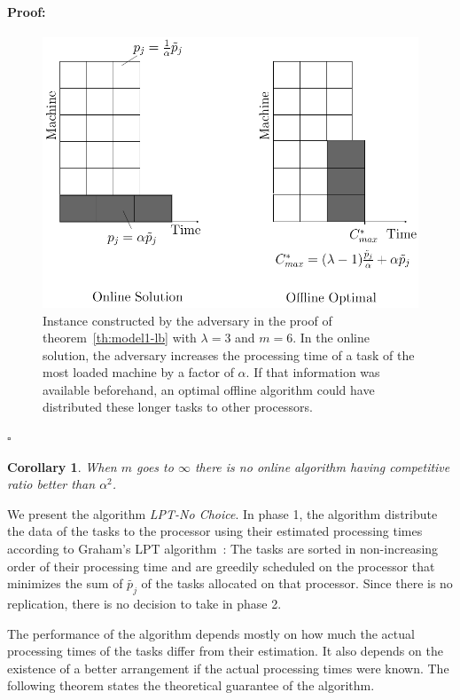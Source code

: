 \documentclass[12pt]{article}
\theoremstyle{mystyle}
\newtheorem{corollary}{Corollary}[theorem]
\newenvironment{myproof}{\paragraph{Proof:}}{\hfill$\square$}
\begin{document}
\begin{myproof}
   
     \begin{figure}[htp]
     \centering
     \includegraphics[width= 12 cm]{model1.pdf}
     \caption{Instance constructed by the adversary in the proof of
       theorem~\ref{th:model1-lb} with $\lambda = 3$ and $m = 6$. In the
       online solution, the adversary increases 
       the processing time of a task of the most loaded machine by a factor of $\alpha$. If
       that information was available beforehand, an optimal offline
       algorithm could have distributed these longer tasks to other
       processors.}
     \label{fig:rara}
     \end{figure}
   \end{myproof}    
     
     
     \begin{corollary}
     When $m$ goes to $\infty$ there is no online algorithm having competitive ratio better than $\alpha^{2}$.
     \end{corollary}
     
   
   We present the algorithm \textit{LPT-No Choice}. In phase 1, the
   algorithm distribute the data of the tasks to the processor using
   their estimated processing times according to Graham's LPT
   algorithm~\cite{Graham69boundson}: The tasks are sorted in non-increasing
   order of their processing time and are greedily scheduled on the
   processor that minimizes the sum of $\tilde{p_j}$ of the tasks
   allocated on that processor. Since there is no replication, there is
   no decision to take in phase 2.
   
   The performance of the algorithm depends mostly on how much the actual
   processing times of the tasks differ from their estimation. It also depends on the
   existence of a better arrangement if the actual processing times were
   known. The following theorem states the theoretical guarantee of the
   algorithm.
   
\end{document}
